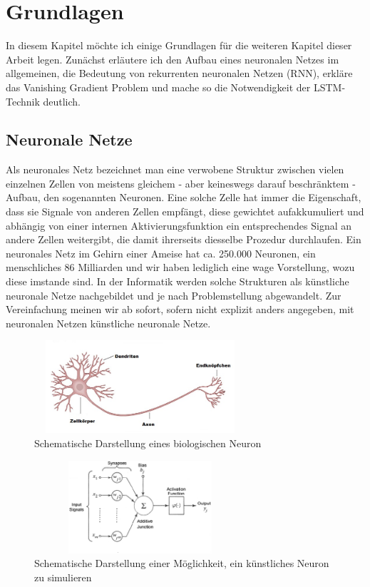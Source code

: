 \chapter{Grundlagen} 
\label{ch:grundlagen}
In diesem Kapitel möchte ich einige Grundlagen für die weiteren Kapitel dieser Arbeit legen. Zunächst erläutere ich den Aufbau eines neuronalen Netzes im allgemeinen, die Bedeutung von rekurrenten neuronalen Netzen (RNN), erkläre das Vanishing Gradient Problem und mache so die Notwendigkeit der LSTM-Technik deutlich.
\section{Neuronale Netze}
Als neuronales Netz bezeichnet man eine verwobene Struktur zwischen vielen einzelnen Zellen von meistens gleichem - aber keineswegs darauf beschr\"anktem - Aufbau, den sogenannten Neuronen. Eine solche Zelle hat immer die Eigenschaft, dass sie Signale von anderen Zellen empfängt, diese gewichtet aufakkumuliert und abhängig von einer internen Aktivierungsfunktion ein entsprechendes Signal an andere Zellen weitergibt, die damit ihrerseits diesselbe Prozedur durchlaufen. Ein neuronales Netz im Gehirn einer Ameise hat ca. 250.000 Neuronen, ein menschliches 86 Milliarden \cite{bib:number} und wir haben lediglich eine wage Vorstellung, wozu diese imstande sind. In der Informatik werden solche Strukturen als künstliche neuronale Netze nachgebildet und je nach Problemstellung abgewandelt. Zur Vereinfachung meinen wir ab sofort, sofern nicht explizit anders angegeben, mit neuronalen Netzen künstliche neuronale Netze.
\begin{figure}
	\centering
	\includegraphics[width=0.7\textwidth, height=130px]{pics/neuron.jpg}	
	\caption{Schematische Darstellung eines biologischen Neuron \cite{bib:neuron}}
	\label{img:neuron}
\end{figure}
\begin{figure}
	\centering
	\includegraphics[width=0.7\textwidth, height=130px]{pics/aneuron.png}	
	\caption{Schematische Darstellung einer Möglichkeit, ein künstliches Neuron zu simulieren \cite{bib:aneuron}}
	\label{img:aneuron}
\end{figure}
